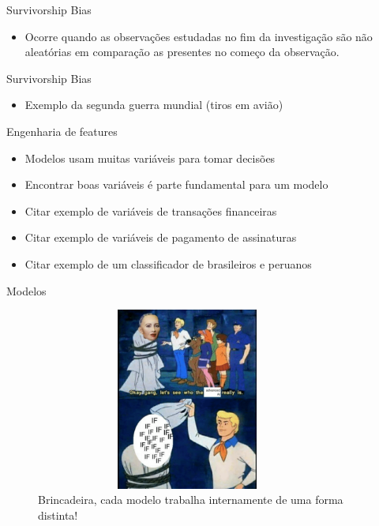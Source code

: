 \begin{frame}	
	\begin{block}{Survivorship Bias}	
		\begin{itemize} 
			\item Ocorre quando as observações estudadas no fim da investigação são não aleatórias em comparação as presentes no começo da observação.		
		\end{itemize}
	\end{block}
\end{frame}


\begin{frame}	
	\begin{block}{Survivorship Bias}	
		\begin{itemize} 
			\item Exemplo da segunda guerra mundial (tiros em avião)
		\end{itemize}
	\end{block}
\end{frame}


\begin{frame}	
	\begin{block}{Engenharia de features}
		\begin{itemize}
			\item Modelos usam muitas variáveis para tomar decisões
			\item Encontrar boas variáveis é parte fundamental para um modelo
			\item Citar exemplo de variáveis de transações financeiras
			\item Citar exemplo de variáveis de pagamento de assinaturas
			\item Citar exemplo de um classificador de brasileiros e peruanos			
		\end{itemize}		
	\end{block}
\end{frame}


\begin{frame}	
	\begin{block}{Modelos}	
			\begin{figure}[!htb]
			\centering	  				
			\includegraphics[height=6cm, width = 10cm]{./pic/AI.png}
			\caption{Brincadeira, cada modelo trabalha internamente de uma forma distinta!}
			\label{fig_brincadeira}
		\end{figure}	
	\end{block}
\end{frame}

